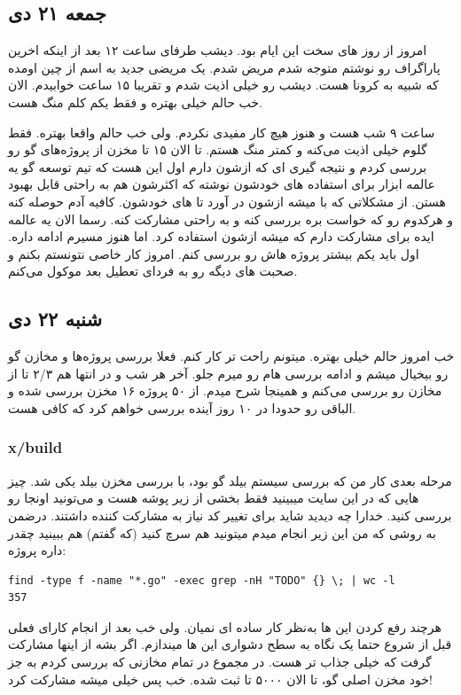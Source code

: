 \subsection{جمعه ۲۱ دی}
امروز از روز های سخت این ایام بود. دیشب طرفای ساعت ۱۲ بعد از اینکه اخرین پاراگراف رو نوشتم متوجه شدم مریض شدم.
یک مریضی جدید به اسم  از چین اومده که شبیه به کرونا هست. دیشب رو خیلی اذیت شدم و تقریبا ۱۵ ساعت خوابیدم.
الان خب حالم خیلی بهتره و فقط یکم کلم منگ هست.

ساعت ۹ شب هست و هنوز هیچ کار مفیدی نکردم. ولی خب حالم واقعا بهتره. فقط گلوم خیلی اذیت می‌کنه و کمتر منگ هستم.
تا الان ۱۵ تا مخزن از پروژه‌های گو رو بررسی کردم و نتیجه گیری ای که ازشون دارم اول این هست که تیم توسعه گو یه عالمه ابزار برای استفاده های خودشون
نوشته که اکثرشون هم به راحتی قابل بهبود هستن. از مشکلاتی که با  میشه ازشون در آورد تا  های خودشون. کافیه
آدم حوصله کنه و هرکدوم رو که خواست بره بررسی کنه و به راحتی مشارکت کنه. رسما الان یه عالمه ایده برای مشارکت دارم که میشه ازشون استفاده کرد.
اما هنوز مسیرم ادامه داره. اول باید یکم بیشتر پروژه هاش رو بررسی کنم. امروز کار خاصی نتونستم بکنم و صحبت های دیگه رو به فردای تعطیل بعد موکول
می‌کنم.

\subsection{شنبه ۲۲ دی}
خب امروز حالم خیلی بهتره. میتونم راحت تر کار کنم. فعلا بررسی پروژه‌ها و مخازن گو رو بیخیال میشم و ادامه بررسی هام رو میرم جلو.
آخر هر شب و در انتها هم ۲/۳ تا از مخازن رو بررسی می‌کنم و همینجا شرح میدم. از ۵۰ پروژه ۱۶ مخزن بررسی شده و الباقی رو حدودا در ۱۰ روز آینده
بررسی خواهم کرد که کافی هست.

\subsubsection{x/build}
مرحله بعدی کار من که بررسی سیستم بیلد گو
بود، با بررسی مخزن بیلد یکی شد. چیز هایی که در این سایت میبینید فقط بخشی از زیر پوشه  هست و می‌تونید اونجا رو بررسی کنید.
خدارا چه دیدید شاید برای تغییر کد  نیاز به مشارکت کننده داشتند. درضمن به روشی که من این زیر انجام میدم میتونید هم سرچ کنید (که گفتم)
هم ببینید چقدر  داره پروژه:

\begin{latin}
\begin{verbatim}
find -type f -name "*.go" -exec grep -nH "TODO" {} \; | wc -l
357
\end{verbatim}
\end{latin}
هرچند رفع کردن این  ها به‌نظر کار ساده ای نمیان. ولی خب بعد از انجام کارای فعلی قبل از شروع حتما یک نگاه به سطح دشواری این 
ها میندازم. اگر بشه از اینها مشارکت گرفت که خیلی جذاب تر هست. در مجموع در تمام مخازنی که بررسی کردم به جز خود مخزن اصلی گو، تا الان ۵۰۰۰
تا  ثبت شده. خب پس خیلی میشه مشارکت کرد!


